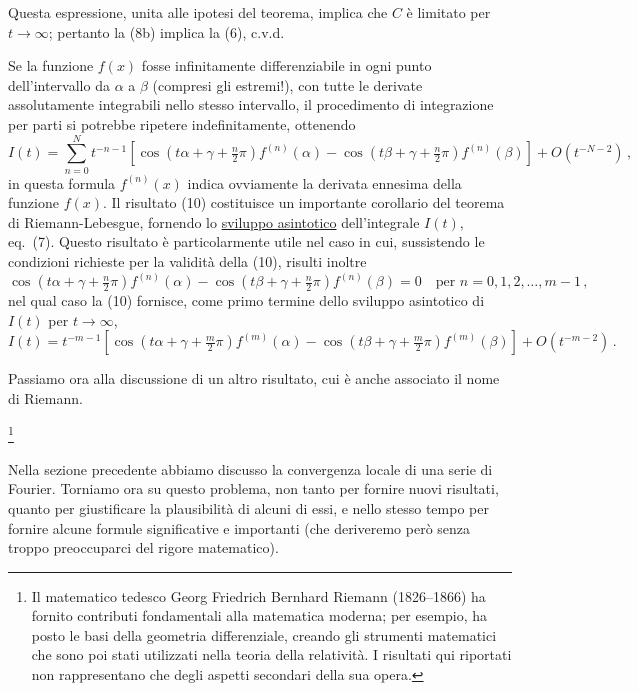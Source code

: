 \documentclass[11pt, a4paper]{book}
\numberwithin{equation}{section}
\begin{document}
Questa espressione, unita alle ipotesi del teorema, implica che $C$ è limitato per $t\to\infty$; pertanto la (8b) implica la (6), c.v.d.

Se la funzione $f(x)$ fosse infinitamente differenziabile in ogni punto dell'intervallo da $\alpha$ a $\beta$ (compresi gli estremi!), con tutte le derivate assolutamente integrabili nello stesso intervallo, il procedimento di integrazione per parti si potrebbe ripetere indefinitamente, ottenendo
\begin{equation}
  I(t) = \sum_{n=0}^{N} t^{-n-1}\left[\cos\!\left(t\alpha+\gamma+\tfrac{n}{2}\pi\right)f^{(n)}(\alpha)
  - \cos\!\left(t\beta+\gamma+\tfrac{n}{2}\pi\right)f^{(n)}(\beta)\right]
  + O\!\left(t^{-N-2}\right)\,, \tag{10}
\end{equation}
in questa formula $f^{(n)}(x)$ indica ovviamente la derivata ennesima della funzione $f(x)$. Il risultato (10) costituisce un importante corollario del teorema di Riemann-Lebesgue, fornendo lo \underline{sviluppo asintotico} dell'integrale $I(t)$, eq.\ (7). Questo risultato è particolarmente utile nel caso in cui, sussistendo le condizioni richieste per la validità della (10), risulti inoltre
\begin{equation}
  \cos\!\left(t\alpha+\gamma+\tfrac{n}{2}\pi\right)f^{(n)}(\alpha)
  - \cos\!\left(t\beta+\gamma+\tfrac{n}{2}\pi\right)f^{(n)}(\beta) = 0
  \quad\text{per } n=0,1,2,\ldots,m-1\,, \tag{11}
\end{equation}
nel qual caso la (10) fornisce, come primo termine dello sviluppo asintotico di $I(t)$ per $t\to\infty$,
\begin{equation}
  I(t) = t^{-m-1}\left[\cos\!\left(t\alpha+\gamma+\tfrac{m}{2}\pi\right)f^{(m)}(\alpha)
  - \cos\!\left(t\beta+\gamma+\tfrac{m}{2}\pi\right)f^{(m)}(\beta)\right]
  + O\!\left(t^{-m-2}\right)\,. \tag{12}
\end{equation}

Passiamo ora alla discussione di un altro risultato, cui è anche associato il nome di Riemann.

\footnote{Il matematico tedesco Georg Friedrich Bernhard Riemann (1826--1866) ha fornito contributi fondamentali alla matematica moderna; per esempio, ha posto le basi della geometria differenziale, creando gli strumenti matematici che sono poi stati utilizzati nella teoria della relatività. I risultati qui riportati non rappresentano che degli aspetti secondari della sua opera.}



Nella sezione precedente abbiamo discusso la convergenza locale di una serie di Fourier. Torniamo ora su questo problema, non tanto per fornire nuovi risultati, quanto per giustificare la plausibilità di alcuni di essi, e nello stesso tempo per fornire alcune formule significative e importanti (che deriveremo però senza troppo preoccuparci del rigore matematico).
\end{document}
